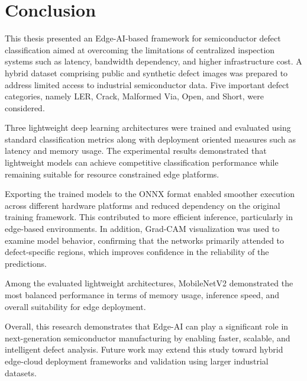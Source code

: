 \chapter{Conclusion}
This thesis presented an Edge-AI-based framework for semiconductor defect classification aimed at overcoming the limitations of centralized inspection systems such as latency, bandwidth dependency, and higher infrastructure cost. A hybrid dataset comprising public and synthetic defect images was prepared to address limited access to industrial semiconductor data. Five important defect categories, namely LER, Crack, Malformed Via, Open, and Short, were considered.

Three lightweight deep learning architectures were trained and evaluated using standard classification metrics along with deployment oriented measures such as latency and memory usage. The experimental results demonstrated that lightweight models can achieve competitive classification performance while remaining suitable for resource constrained edge platforms.

Exporting the trained models to the ONNX format enabled smoother execution across different hardware platforms and reduced dependency on the original training framework. This contributed to more efficient inference, particularly in edge-based environments. In addition, Grad-CAM visualization was used to examine model behavior, confirming that the networks primarily attended to defect-specific regions, which improves confidence in the reliability of the predictions.

Among the evaluated lightweight architectures, MobileNetV2 demonstrated the most balanced performance in terms of memory usage, inference speed, and overall suitability for edge deployment.

Overall, this research demonstrates that Edge-AI can play a significant role in next-generation semiconductor manufacturing by enabling faster, scalable, and intelligent defect analysis. Future work may extend this study toward hybrid edge-cloud deployment frameworks and validation using larger industrial datasets.

